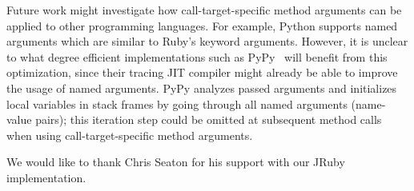 \documentclass{sigplanconf} %
\begin{document}
Future work might investigate how call-target-specific method arguments can be applied to other programming languages. For example, Python supports named arguments which are similar to Ruby's keyword arguments. However, it is unclear to what degree efficient implementations such as PyPy~\cite{Bolz:2009:TMP:1565824.1565827} will benefit from this optimization, since their tracing JIT compiler might already be able to improve the usage of named arguments. PyPy analyzes passed arguments and initializes local variables in stack frames by going through all named arguments (name-value pairs); this iteration step could be omitted at subsequent method calls when using call-target-specific method arguments.

\acks
We would like to thank Chris Seaton for his support with our JRuby implementation.

%

%
%
\end{document}
